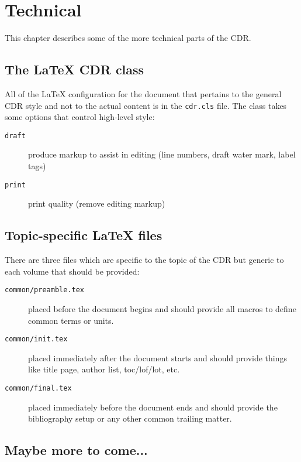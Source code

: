 \chapter{Technical}

This chapter describes some of the more technical parts of the CDR.

\section{The \LaTeX{} CDR class}

All of the \LaTeX{} configuration for the document that pertains to the general CDR style and not to the actual content is in the \texttt{cdr.cls} file.  The class takes some options that control high-level style:

\begin{description}
\item[\texttt{draft}] produce markup to assist in editing (line numbers, draft water mark, label tags)
\item[\texttt{print}] print quality (remove editing markup)
\end{description}

\section{Topic-specific \LaTeX{} files}

There are three files which are specific to the topic of the CDR but generic to each volume that should be provided:

\begin{description}
\item[\texttt{common/preamble.tex}] placed before the document begins and should provide all macros to define common terms or units.
\item[\texttt{common/init.tex}] placed immediately after the document starts and should provide things like title page, author list, toc/lof/lot, etc.
\item[\texttt{common/final.tex}] placed immediately before the document ends and should provide the bibliography setup or any other common trailing matter.
\end{description}

\section{Maybe more to come...}